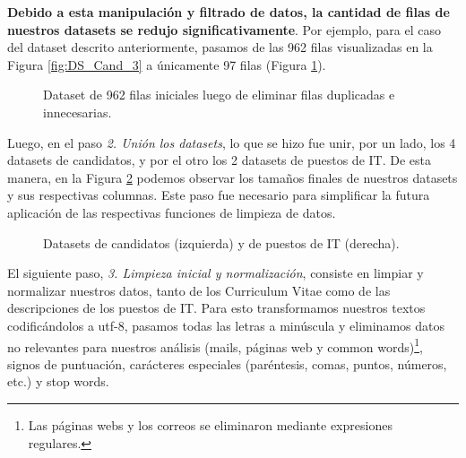 \documentclass[12pt,a4paper]{article}
\begin{document}
\begin{sloppypar}
\textbf{Debido a esta manipulación y filtrado de datos, la cantidad de filas de nuestros datasets se redujo significativamente}. Por ejemplo, para el caso del dataset descrito anteriormente, pasamos de las 962 filas visualizadas en la Figura \ref{fig:DS_Cand_3} a únicamente 97 filas (Figura \ref{fig:DS_Cand_3_sin_dup}). 

\begin{figure}[H] 
 \centering
 \noindent{}
 \caption{Dataset de 962 filas iniciales luego de eliminar filas duplicadas e innecesarias.} 
 \label{fig:DS_Cand_3_sin_dup}
\end{figure}

Luego, en el paso \textit{2. Unión los datasets}, lo que se hizo fue unir, por un lado, los 4 datasets de candidatos, y por el otro los 2 datasets de puestos de IT. De esta manera, en la Figura \ref{fig:final_antes_preproc} podemos observar los tamaños finales de nuestros datasets y sus respectivas columnas. Este paso fue necesario para simplificar la futura aplicación de las respectivas funciones de limpieza de datos.

\begin{figure}[H] 
 \centering
 \noindent{}
 \caption{Datasets de candidatos (izquierda) y de puestos de IT (derecha).} 
 \label{fig:final_antes_preproc}
\end{figure}

El siguiente paso, \textit{3. Limpieza inicial y normalización}, consiste en limpiar y normalizar nuestros datos, tanto de los Curriculum Vitae como de las descripciones de los puestos de IT. Para esto transformamos nuestros textos codificándolos a utf-8, pasamos todas las letras a minúscula y eliminamos datos no relevantes para nuestros análisis (mails, páginas web y common words)\footnote{Las páginas webs y los correos se eliminaron mediante expresiones regulares.}, signos de puntuación, carácteres especiales (paréntesis, comas, puntos, números, etc.) y stop words.


\end{sloppypar}
\end{document}

